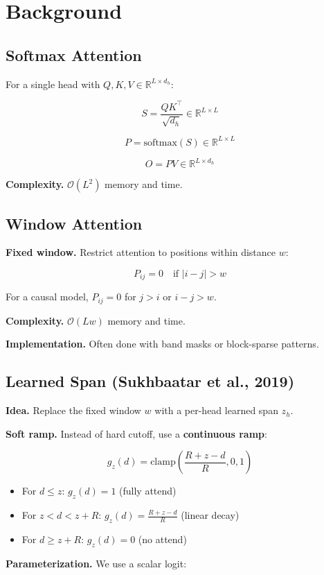 
\section{Background}

\subsection{Softmax Attention}

For a single head with $Q, K, V \in \mathbb{R}^{L \times d_h}$:

\[
S = \frac{Q K^\top}{\sqrt{d_h}} \in \mathbb{R}^{L \times L}
\]

\[
P = \text{softmax}(S) \in \mathbb{R}^{L \times L}
\]

\[
O = P V \in \mathbb{R}^{L \times d_h}
\]

\textbf{Complexity.} $\mathcal{O}(L^2)$ memory and time.

\subsection{Window Attention}

\textbf{Fixed window.} Restrict attention to positions within distance $w$:

\[
P_{ij} = 0 \quad \text{if } |i - j| > w
\]

For a causal model, $P_{ij} = 0$ for $j > i$ or $i - j > w$.

\textbf{Complexity.} $\mathcal{O}(L w)$ memory and time.

\textbf{Implementation.} Often done with band masks or block-sparse patterns.

\subsection{Learned Span (Sukhbaatar et al., 2019)}

\textbf{Idea.} Replace the fixed window $w$ with a per-head learned span $z_h$.

\textbf{Soft ramp.} Instead of hard cutoff, use a \textbf{continuous ramp}:

\[
g_z(d) = \text{clamp}\!\left(\frac{R + z - d}{R}, 0, 1\right)
\]

\begin{itemize}
\item For $d \leq z$: $g_z(d) = 1$ (fully attend)
\item For $z < d < z + R$: $g_z(d) = \frac{R + z - d}{R}$ (linear decay)
\item For $d \geq z + R$: $g_z(d) = 0$ (no attend)

\end{itemize}
\textbf{Parameterization.} We use a scalar logit:

